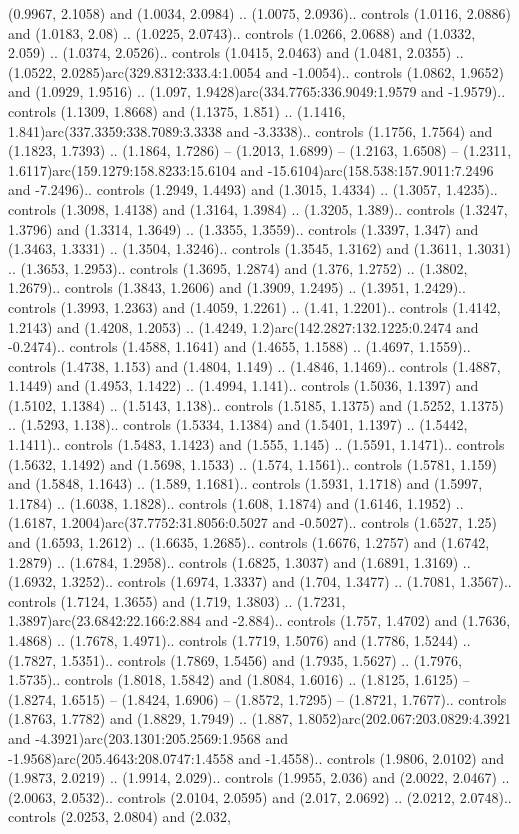 (0.9967, 2.1058) and (1.0034, 2.0984) .. (1.0075, 2.0936).. controls (1.0116, 2.0886) and (1.0183, 2.08) .. (1.0225, 2.0743).. controls (1.0266, 2.0688) and (1.0332, 2.059) .. (1.0374, 2.0526).. controls (1.0415, 2.0463) and (1.0481, 2.0355) .. (1.0522, 2.0285)arc(329.8312:333.4:1.0054 and -1.0054).. controls (1.0862, 1.9652) and (1.0929, 1.9516) .. (1.097, 1.9428)arc(334.7765:336.9049:1.9579 and -1.9579).. controls (1.1309, 1.8668) and (1.1375, 1.851) .. (1.1416, 1.841)arc(337.3359:338.7089:3.3338 and -3.3338).. controls (1.1756, 1.7564) and (1.1823, 1.7393) .. (1.1864, 1.7286) -- (1.2013, 1.6899) -- (1.2163, 1.6508) -- (1.2311, 1.6117)arc(159.1279:158.8233:15.6104 and -15.6104)arc(158.538:157.9011:7.2496 and -7.2496).. controls (1.2949, 1.4493) and (1.3015, 1.4334) .. (1.3057, 1.4235).. controls (1.3098, 1.4138) and (1.3164, 1.3984) .. (1.3205, 1.389).. controls (1.3247, 1.3796) and (1.3314, 1.3649) .. (1.3355, 1.3559).. controls (1.3397, 1.347) and (1.3463, 1.3331) .. (1.3504, 1.3246).. controls (1.3545, 1.3162) and (1.3611, 1.3031) .. (1.3653, 1.2953).. controls (1.3695, 1.2874) and (1.376, 1.2752) .. (1.3802, 1.2679).. controls (1.3843, 1.2606) and (1.3909, 1.2495) .. (1.3951, 1.2429).. controls (1.3993, 1.2363) and (1.4059, 1.2261) .. (1.41, 1.2201).. controls (1.4142, 1.2143) and (1.4208, 1.2053) .. (1.4249, 1.2)arc(142.2827:132.1225:0.2474 and -0.2474).. controls (1.4588, 1.1641) and (1.4655, 1.1588) .. (1.4697, 1.1559).. controls (1.4738, 1.153) and (1.4804, 1.149) .. (1.4846, 1.1469).. controls (1.4887, 1.1449) and (1.4953, 1.1422) .. (1.4994, 1.141).. controls (1.5036, 1.1397) and (1.5102, 1.1384) .. (1.5143, 1.138).. controls (1.5185, 1.1375) and (1.5252, 1.1375) .. (1.5293, 1.138).. controls (1.5334, 1.1384) and (1.5401, 1.1397) .. (1.5442, 1.1411).. controls (1.5483, 1.1423) and (1.555, 1.145) .. (1.5591, 1.1471).. controls (1.5632, 1.1492) and (1.5698, 1.1533) .. (1.574, 1.1561).. controls (1.5781, 1.159) and (1.5848, 1.1643) .. (1.589, 1.1681).. controls (1.5931, 1.1718) and (1.5997, 1.1784) .. (1.6038, 1.1828).. controls (1.608, 1.1874) and (1.6146, 1.1952) .. (1.6187, 1.2004)arc(37.7752:31.8056:0.5027 and -0.5027).. controls (1.6527, 1.25) and (1.6593, 1.2612) .. (1.6635, 1.2685).. controls (1.6676, 1.2757) and (1.6742, 1.2879) .. (1.6784, 1.2958).. controls (1.6825, 1.3037) and (1.6891, 1.3169) .. (1.6932, 1.3252).. controls (1.6974, 1.3337) and (1.704, 1.3477) .. (1.7081, 1.3567).. controls (1.7124, 1.3655) and (1.719, 1.3803) .. (1.7231, 1.3897)arc(23.6842:22.166:2.884 and -2.884).. controls (1.757, 1.4702) and (1.7636, 1.4868) .. (1.7678, 1.4971).. controls (1.7719, 1.5076) and (1.7786, 1.5244) .. (1.7827, 1.5351).. controls (1.7869, 1.5456) and (1.7935, 1.5627) .. (1.7976, 1.5735).. controls (1.8018, 1.5842) and (1.8084, 1.6016) .. (1.8125, 1.6125) -- (1.8274, 1.6515) -- (1.8424, 1.6906) -- (1.8572, 1.7295) -- (1.8721, 1.7677).. controls (1.8763, 1.7782) and (1.8829, 1.7949) .. (1.887, 1.8052)arc(202.067:203.0829:4.3921 and -4.3921)arc(203.1301:205.2569:1.9568 and -1.9568)arc(205.4643:208.0747:1.4558 and -1.4558).. controls (1.9806, 2.0102) and (1.9873, 2.0219) .. (1.9914, 2.029).. controls (1.9955, 2.036) and (2.0022, 2.0467) .. (2.0063, 2.0532).. controls (2.0104, 2.0595) and (2.017, 2.0692) .. (2.0212, 2.0748).. controls (2.0253, 2.0804) and (2.032, 